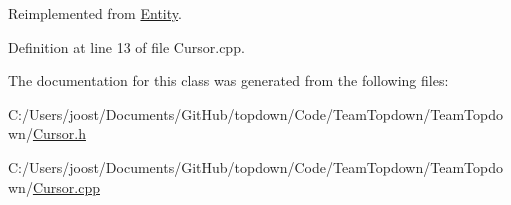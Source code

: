 Reimplemented from \hyperlink{class_entity_aed73e98b980b85833428c935cc1c69f8}{Entity}.



Definition at line 13 of file Cursor.\+cpp.



The documentation for this class was generated from the following files\+:\begin{DoxyCompactItemize}
\item 
C\+:/\+Users/joost/\+Documents/\+Git\+Hub/topdown/\+Code/\+Team\+Topdown/\+Team\+Topdown/\hyperlink{_cursor_8h}{Cursor.\+h}\item 
C\+:/\+Users/joost/\+Documents/\+Git\+Hub/topdown/\+Code/\+Team\+Topdown/\+Team\+Topdown/\hyperlink{_cursor_8cpp}{Cursor.\+cpp}\end{DoxyCompactItemize}
